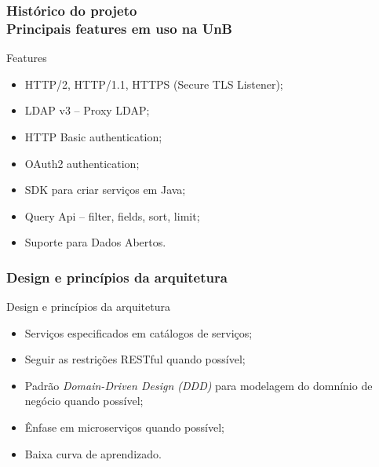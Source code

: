 \documentclass{beamer}
\begin{document}
\begin{frame}
	\frametitle{Histórico do projeto \\ \small{Principais features em uso na UnB}}

\begin{exampleblock}{Features}
	
	\begin{itemize}
		\item<1->HTTP/2, HTTP/1.1, HTTPS (Secure TLS Listener);
		\item<1->LDAP v3 -- Proxy LDAP;
		\item<1->HTTP Basic authentication;
		\item<1->OAuth2 authentication;
		\item<1->SDK para criar serviços em Java;
		\item<1->Query Api -- filter, fields, sort, limit;
		\item<1->Suporte para Dados Abertos.
	\end{itemize}
	
\end{exampleblock}


\end{frame}




\begin{frame}
\frametitle{Design e princípios da arquitetura}

\begin{exampleblock}{Design e princípios da arquitetura}
	
	\begin{itemize}
		\item<1->Serviços especificados em catálogos de serviços;
		\item<1->Seguir as restrições RESTful quando possível;
		\item<1->Padrão \emph{Domain-Driven Design (DDD)} para modelagem do domnínio de negócio quando possível;
		\item<1->Ênfase em microserviços quando possível;
		\item<1->Baixa curva de aprendizado.
	\end{itemize}
	
\end{exampleblock}


\end{frame}
\end{document}
